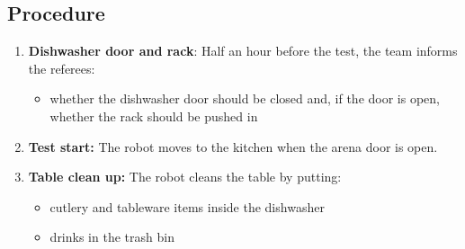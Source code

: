 \subsection*{Procedure}
\begin{enumerate}[nosep]
	\item \textbf{Dishwasher door and rack}: Half an hour before the test, the team informs the referees:
		\begin{itemize}
			\item whether the dishwasher door should be closed and, if the door is open, whether the rack should be pushed in
		\end{itemize}
	\item \textbf{Test start:} The robot moves to the kitchen when the arena door is open.
	\item \textbf{Table clean up:} The robot cleans the table by putting:
		\begin{itemize}
			\item cutlery and tableware items inside the dishwasher
			\item drinks in the trash bin
		\end{itemize}
\end{enumerate}


